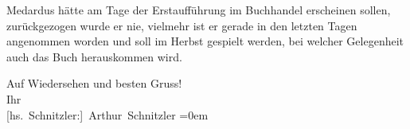 \pstart
           Medardus hätte am Tage der Erstaufführung im
               Buchhandel erscheinen sollen, zurückgezogen wurde er nie, vielmehr ist er gerade in
               den letzten Tagen angenommen worden und soll im Herbst gespielt werden, bei welcher
               Gelegenheit auch das Buch herauskommen wird.\pend
           
\pstart
           Auf Wiedersehen und besten Gruss!{\\[\baselineskip]}Ihr{\\[\baselineskip]}\spacefill\mbox{{[}hs. Schnitzler:{]} Arthur Schnitzler}\pend
           \leftskip=0em{}\endnumbering{}  \newcommand{\dateiname}{L01913}\newcommand{\titel}{Arthur Schnitzler an Albert Ehrenstein, 12. 2. 1910}\newcommand{\editorInnen}{Martin Anton Müller und Gerd-Hermann Susen}
